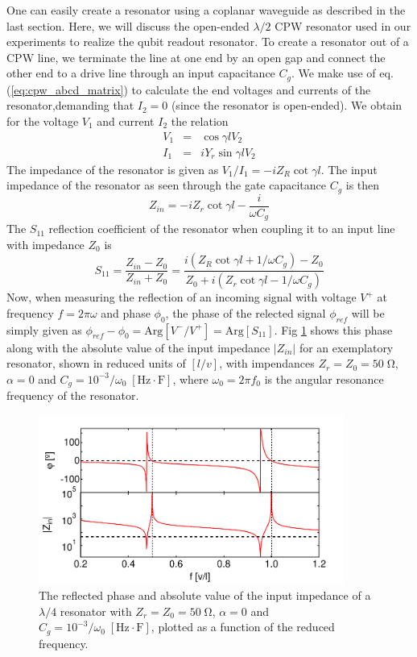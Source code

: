 One can easily create a resonator using a coplanar waveguide as described in the last section. Here, we will discuss the open-ended $\lambda / 2$ CPW resonator used in our experiments to realize the qubit readout resonator. To create a resonator out of a CPW line, we terminate the line at one end by an open gap and connect the other end to a drive line through an input capacitance $C_g$. We make use of eq. (\ref{eq:cpw_abcd_matrix}) to calculate the end voltages and currents of the resonator,demanding that $I_2=0$ (since the resonator is open-ended). We obtain for the voltage $V_1$ and current $I_2$ the relation
%
\begin{eqnarray}
V_1 & = & \cos{\gamma l} V_2 \\
I_1 & = & i Y_r \sin{\gamma l} V_2
\end{eqnarray}
%
The impedance of the resonator is given as $V_1/I_1 = -i Z_R \cot{\gamma l}$. The input impedance of the resonator as seen through the gate capacitance $C_g$ is then
%
\begin{equation}
Z_{in} = -i Z_r \cot{\gamma l}-\frac{i}{\omega C_g} \label{eq:cpw_impedance}
\end{equation}
%
The $S_{11}$ reflection coefficient of the resonator when coupling it to an input line with impedance $Z_0$ is
%
\begin{equation}
S_{11} = \frac{Z_{in}-Z_0}{Z_{in}+Z_0} = \frac{i(Z_R\cot{\gamma l}+1/\omega C_g)-Z_0}{Z_0+i(Z_r\cot{\gamma l}-1/\omega C_g)}
\end{equation}
%
Now, when measuring the reflection of an incoming signal with voltage $V^+$ at frequency $f=2\pi \omega$ and phase $\phi_0$, the phase of the relected signal $\phi_{ref}$ will be simply given as $\phi_{ref}-\phi_0=\mathrm{Arg}[V^-/V^+] = \mathrm{Arg}[S_{11}]$. Fig \ref{fig:lambda_over_4_response} shows this phase along with the absolute value of the input impedance $|Z_{in}|$ for an exemplatory resonator, shown in reduced units of $[l/v]$, with impendances $Z_r=Z_0=50\;\mathrm{\Omega}$, $\alpha=0$ and $C_g=10^{-3}/\omega_0\;[\mathrm{Hz}\cdot \mathrm{F}]$, where $\omega_0 = 2\pi f_0$ is the angular resonance frequency of the resonator.

\begin{figure}
	\includegraphics[width=10cm]{"./material/mathematica/cpw_lambda_over_4_phase_and_z"}
	\caption{The reflected phase and absolute value of the input impedance of a $\lambda/4$ resonator with $Z_r=Z_0=50\;\mathrm{\Omega}$, $\alpha=0$ and $C_g=10^{-3}/\omega_0\;[\mathrm{Hz}\cdot\mathrm{F}]$, plotted as a function of the reduced frequency.}
	\label{fig:lambda_over_4_response}
\end{figure}

